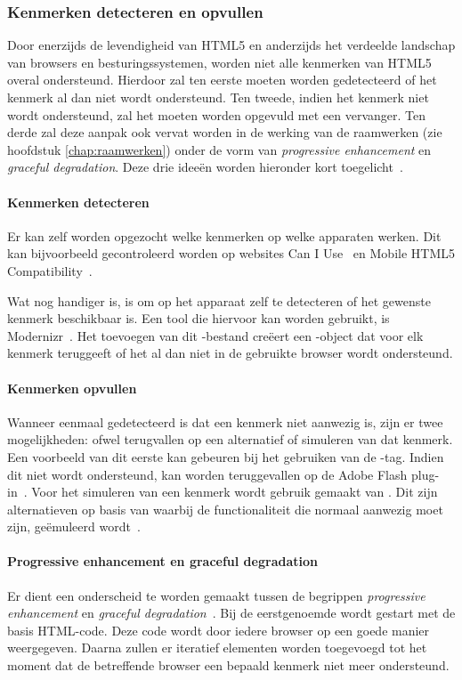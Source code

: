 \subsubsection{Kenmerken detecteren en opvullen}
Door enerzijds de levendigheid van HTML5 en anderzijds het verdeelde landschap van browsers en besturingssystemen, worden niet alle kenmerken van HTML5 overal ondersteund. 
Hierdoor zal ten eerste moeten worden gedetecteerd of het kenmerk al dan niet wordt ondersteund.
Ten tweede, indien het kenmerk niet wordt ondersteund, zal het moeten worden opgevuld met een vervanger.
Ten derde zal deze aanpak ook vervat worden in de werking van de raamwerken (zie hoofdstuk \ref{chap:raamwerken}) onder de vorm van \emph{progressive enhancement} en \emph{graceful degradation}.
Deze drie ideeën worden hieronder kort toegelicht~\cite{MacDonald2011}.

\paragraph{Kenmerken detecteren}
Er kan zelf worden opgezocht welke kenmerken op welke apparaten werken.
Dit kan bijvoorbeeld gecontroleerd worden op websites Can I Use~\cite{Deveria2013c} en Mobile HTML5 Compatibility~\cite{Firtman2013a}. 

Wat nog handiger is, is om op het apparaat zelf te detecteren of het gewenste kenmerk beschikbaar is. 
Een tool die hiervoor kan worden gebruikt, is Modernizr~\cite{Modernizr2012}. 
Het toevoegen van dit \js{}-bestand creëert een \js{}-object dat voor elk kenmerk teruggeeft of het al dan niet in de gebruikte browser wordt ondersteund.

\paragraph{Kenmerken opvullen}
Wanneer eenmaal gedetecteerd is dat een kenmerk niet aanwezig is, zijn er twee mogelijkheden: ofwel terugvallen op een alternatief of simuleren van dat kenmerk. 
Een voorbeeld van dit eerste kan gebeuren bij het gebruiken van de -tag. 
Indien dit niet wordt ondersteund, kan worden teruggevallen op de Adobe Flash plug-in~\cite{Adobe2013}. 
Voor het simuleren van een kenmerk wordt gebruik gemaakt van . 
Dit zijn alternatieven op basis van \js{} waarbij de  functionaliteit die normaal aanwezig moet zijn, geëmuleerd wordt~\cite{Weyl2011}.

\paragraph{Progressive enhancement en graceful degradation}
\label{par:progressive-enhancement}
Er dient een onderscheid te worden gemaakt tussen de begrippen \emph{progressive enhancement} en \emph{graceful degradation}~\cite{Hens2012}. 
Bij de eerstgenoemde wordt gestart met de basis HTML-code.
Deze code wordt door iedere browser op een goede manier weergegeven. 
Daarna zullen er iteratief elementen worden toegevoegd tot het moment dat de betreffende browser een bepaald kenmerk niet meer ondersteund.

